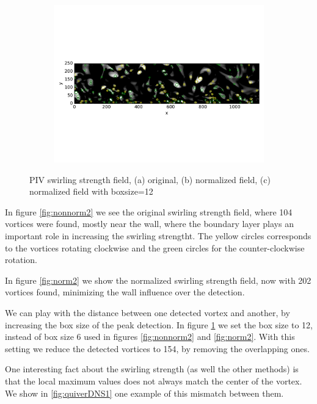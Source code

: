 \documentclass[12pt, a4paper, openany]{memoir}
\begin{document}
\begin{figure}[h!]
\begin{subfigure}[b]{\textwidth}
	\includegraphics[trim=0 130 0 150 , clip, width=\textwidth]{figure/PIVbox12normalized.pdf}
	\caption{}
	\label{fig:boxnorm2}
	\end{subfigure}
	\caption{PIV swirling strength field, (a) original, (b) normalized field, (c) normalized field with boxsize=12 }
	\label{fig:PIVcomparison}
\end{figure}

In figure \ref{fig:nonnorm2} we see the original swirling strength field, where 104 vortices were found, mostly near the wall, where the boundary layer plays an important role in increasing the swirling strengtht. The yellow circles corresponds to the vortices rotating clockwise and the green circles for the counter-clockwise rotation. 

In figure \ref{fig:norm2} we show the normalized swirling strength field, now with 202 vortices found, minimizing the wall influence over the detection.

We can play with the distance between one detected vortex and another, by increasing the box size of the peak detection. In figure \ref{fig:boxnorm2} we set the box size to 12, instead of box size 6 used in figures \ref{fig:nonnorm2} and \ref{fig:norm2}. With this setting we reduce the detected vortices to 154, by removing the overlapping ones.

One interesting fact about the swirling strength (as well the other methods) is that the local maximum values does not always match the center of the vortex. We show in \ref{fig:quiverDNS1} one example of this mismatch between them.
\end{document}
